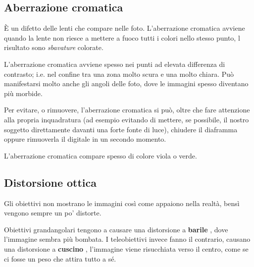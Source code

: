 \subsection{Aberrazione cromatica} \label{subsec:abberrazione}
È un difetto delle lenti che compare nelle foto. L'aberrazione cromatica avviene quando la lente non riesce a mettere a fuoco tutti i colori nello stesso punto, l risultato sono \textit{sbavature} colorate.

L'aberrazione cromatica avviene spesso nei punti ad elevata differenza di contrasto; i.e. nel confine tra una zona molto scura e una molto chiara.
Può manifestarsi molto anche gli angoli delle foto, dove le immagini spesso diventano più morbide.

Per evitare, o rimuovere, l'aberrazione cromatica si può, oltre che fare attenzione alla propria inquadratura (ad esempio evitando di mettere, se possibile, il nostro soggetto direttamente davanti una forte fonte di luce),
chiudere il diaframma oppure rimuoverla il digitale in un secondo momento.

L'aberrazione cromatica compare spesso di colore viola o verde.


\subsection{Distorsione ottica} \label{subsec:distorsioneottica}
Gli obiettivi non mostrano le immagini così come appaiono nella realtà, bensì vengono sempre un po' distorte.

Obiettivi grandangolari tengono a causare una distorsione a \textbf{barile} \label{def:distorsionebarile}, dove l'immagine sembra più bombata.
I teleobiettivi invece fanno il contrario, causano una distorsione a \textbf{cuscino} \label{def:distorsionecuscino}, l'immagine viene risucchiata verso il centro, come se ci fosse un peso che attira tutto a sé.